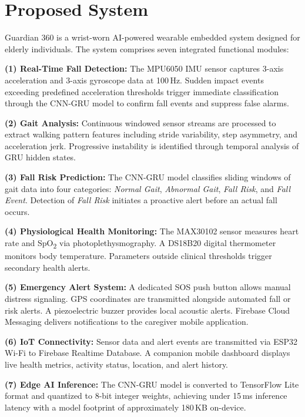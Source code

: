 \documentclass[conference]{IEEEtran}
\begin{document}
\section{Proposed System}

Guardian 360 is a wrist-worn AI-powered wearable embedded system designed for elderly individuals. The system comprises seven integrated functional modules:

\textbf{(1) Real-Time Fall Detection:} The MPU6050 IMU sensor captures 3-axis acceleration and 3-axis gyroscope data at 100\,Hz. Sudden impact events exceeding predefined acceleration thresholds trigger immediate classification through the CNN-GRU model to confirm fall events and suppress false alarms.

\textbf{(2) Gait Analysis:} Continuous windowed sensor streams are processed to extract walking pattern features including stride variability, step asymmetry, and acceleration jerk. Progressive instability is identified through temporal analysis of GRU hidden states.

\textbf{(3) Fall Risk Prediction:} The CNN-GRU model classifies sliding windows of gait data into four categories: \textit{Normal Gait}, \textit{Abnormal Gait}, \textit{Fall Risk}, and \textit{Fall Event}. Detection of \textit{Fall Risk} initiates a proactive alert before an actual fall occurs.

\textbf{(4) Physiological Health Monitoring:} The MAX30102 sensor measures heart rate and SpO\textsubscript{2} via photoplethysmography. A DS18B20 digital thermometer monitors body temperature. Parameters outside clinical thresholds trigger secondary health alerts.

\textbf{(5) Emergency Alert System:} A dedicated SOS push button allows manual distress signaling. GPS coordinates are transmitted alongside automated fall or risk alerts. A piezoelectric buzzer provides local acoustic alerts. Firebase Cloud Messaging delivers notifications to the caregiver mobile application.

\textbf{(6) IoT Connectivity:} Sensor data and alert events are transmitted via ESP32 Wi-Fi to Firebase Realtime Database. A companion mobile dashboard displays live health metrics, activity status, location, and alert history.

\textbf{(7) Edge AI Inference:} The CNN-GRU model is converted to TensorFlow Lite format and quantized to 8-bit integer weights, achieving under 15\,ms inference latency with a model footprint of approximately 180\,KB on-device.
\end{document}
